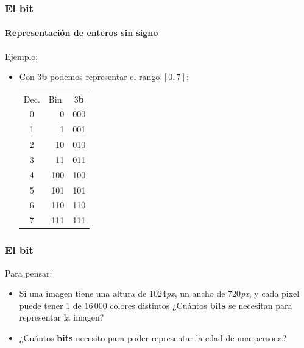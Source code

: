 \documentclass[11pt,a4paper,spanish]{beamer}
\newcommand{\bit}{\textbf{b}}
\begin{document}
\begin{frame}

\frametitle{El \textbf{bit}}
\framesubtitle{Representación de enteros sin signo}

    Ejemplo:
    \begin{itemize}
        \item Con 3\bit{} podemos representar el rango $[0,7]$:
        {\par
        \centering
        \large
        \begin{tabular}{c r c}
            Dec. & {\centering Bin.} & 3\bit\\
            0 &   0 & 000\\ \hline
            1 &   1 & 001\\ \hline
            2 &  10 & 010\\ \hline
            3 &  11 & 011\\ \hline
            4 & 100 & 100\\ \hline
            5 & 101 & 101\\ \hline
            6 & 110 & 110\\ \hline
            7 & 111 & 111\\
        \end{tabular}
        \par}
    \end{itemize}

\end{frame}

\begin{frame}
\frametitle{El \textbf{bit}}

Para pensar:

\begin{itemize}
    \item Si una imagen tiene una altura de 1024\emph{px}, un ancho de
        720\emph{px}, y cada pixel puede tener 1 de $16\,000$ colores
        distintos ¿Cuántos \textbf{bits} se necesitan para representar la
        imagen?
    \item ¿Cuántos \textbf{bits} necesito para poder representar la edad de
        una persona?
\end{itemize}

\end{frame}
\end{document}
